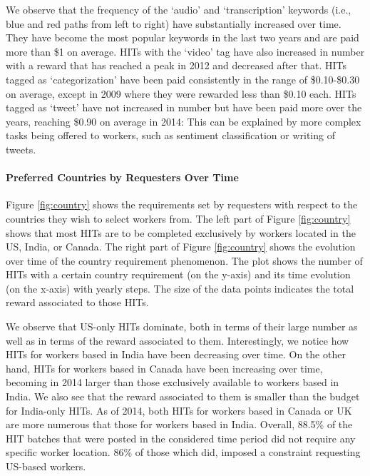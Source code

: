 We observe that the frequency of the `audio' and `transcription' keywords (i.e., blue and red paths from left to right) have substantially increased over time. They have become the most popular keywords in the last two years and are paid more than \$1 on average.
HITs with the `video' tag have also increased in number with a reward that has reached a peak in 2012 and decreased after that.
HITs tagged as `categorization' have been paid consistently in the range of \$0.10-\$0.30 on average, except in 2009 where they were rewarded less than \$0.10 each.
HITs tagged as `tweet' have not increased in number but have been paid more over the years, reaching \$0.90 on average in 2014: This can be explained by more complex tasks being offered to workers, such as sentiment classification or writing of tweets.

\paragraph{Preferred Countries by Requesters Over Time}
Figure \ref{fig:country} shows the requirements set by requesters with respect to the countries they wish to select workers from. The left part of Figure \ref{fig:country} shows that most HITs are to be completed exclusively by workers located in the US, India, or Canada. The right part of Figure \ref{fig:country} shows the evolution over time of the country requirement phenomenon.
The plot shows the number of HITs with a certain country requirement (on the y-axis) and its time evolution (on the x-axis) with yearly steps. The size of the data points indicates the total reward associated to those HITs.

We observe that US-only HITs dominate, both in terms of their large number as well as in terms of the reward associated to them. 
Interestingly, we notice how HITs for workers based in India have been decreasing over time. %
On the other hand, HITs for workers based in Canada have been increasing over time, becoming in 2014 larger than those exclusively available to workers based in India.  We also see that the reward associated to them is smaller than the budget for India-only HITs.
As of 2014, both HITs for workers based in Canada or UK are more numerous that those for workers based in India.
Overall, 88.5\% of the HIT batches that were posted in the considered time period did not require any specific worker location. 86\% of those which did, imposed a constraint requesting US-based workers.



